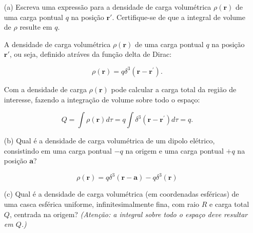 \documentclass[a4paper,12pt]{article}
\begin{document}
\begin{enumerate}
    \item[(a)] Escreva uma expressão para a densidade de carga volumétrica $\rho(\mathbf{r})$ de uma 
    carga pontual $q$ na posição $\mathbf{r}'$. Certifique-se de que a integral de volume de $\rho$ 
    resulte em $q$.

    A densidade de carga volumétrica $\rho(\mathbf{r})$ de uma 
    carga pontual $q$ na posição $\mathbf{r}'$, ou seja, definido
    atr\'aves da função delta de Dirac:

    \begin{equation}
        \boxed{\rho(\mathbf{r})=q \delta^{3}\left(\mathbf{r}-\mathbf{r}^{\prime}\right).}
    \end{equation}

    Com a densidade de carga $\rho(\mathbf{r})$ pode calcular a carga total da regi\~ao de interesse,
    fazendo a integra\c{c}\~ao de volume sobre todo o espa\c{c}o:

    \begin{equation}
        \boxed{Q=\int \rho(\mathbf{r}) d \tau=q \int \delta^{3}\left(\mathbf{r}-\mathbf{r}^{\prime}\right) d \tau=q.}
    \end{equation}


    \item[(b)] Qual é a densidade de carga volumétrica de um dipolo elétrico, consistindo em uma 
    carga pontual $-q$ na origem e uma carga pontual $+q$ na posição $\mathbf{a}$?

    \begin{equation}
        \rho(\mathbf{r})=q \delta^{3}(\mathbf{r}-\mathbf{a})-q \delta^{3}(\mathbf{r})
    \end{equation}

    \item[(c)] Qual é a densidade de carga volumétrica (em coordenadas esféricas) de uma casca 
    esférica uniforme, infinitesimalmente fina, com raio $R$ e carga total $Q$, centrada na origem? 
    \textit{(Atenção: a integral sobre todo o espaço deve resultar em $Q$.)}

    \begin{figure}[!h]
    \begin{center}
\end{center}
\end{figure}
\end{enumerate}
\end{document}
